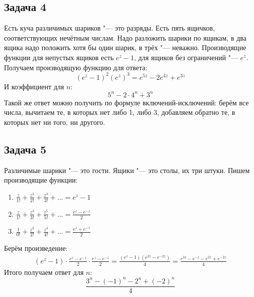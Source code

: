\subsection{Задача 4}
	Есть куча различимых шариков "--- это разряды.
	Есть пять ящичков, соответствующих нечётным числам.
	Надо разложить шарики по ящикам, в два ящика надо положить хотя бы один шарик, в трёх "--- неважно.
	Производящие функции для непустых ящиков есть $e^z-1$,
	для ящиков без ограничений "--- $e^z$.
	Получаем производящую функцию для ответа:
	\[ (e^z-1)^2(e^z)^3 = e^{5z}-2e^{4z}+e^{3z} \]
	И коэффициент для $n$:
	\[ 5^n - 2\cdot4^n + 3^n \]
	Такой же ответ можно получить по формуле включений-исключений: берём все числа, вычитаем те,
	в которых нет либо 1, либо 3, добавляем обратно те, в которых нет ни того, ни другого.

\subsection{Задача 5}
	Различимые шарики "--- это гости.
	Ящики "--- это столы, их три штуки.
	Пишем производящие функции:
	\begin{enumerate}
		\item $\frac{z}{1!} + \frac{z^2}{2!} + \frac{z^3}{3!} + \dots = e^z - 1$
		\item $\frac{z}{1!} + \frac{z^3}{3!} + \frac{z^5}{5!} + \dots = \frac{e^z - e^{-z}}{2}$
		\item $\frac{1}{0!} + \frac{z^2}{2!} + \frac{z^4}{4!} + \dots = \frac{e^z + e^{-z}}{2}$
	\end{enumerate}
	Берём произведение:
	\begin{gather*}
		(e^z-1)\cdot\frac{e^z-e^{-z}}{2}\cdot\frac{e^z-e^{-z}}{2} =
		\frac{(e^z-1)(e^{2z}-e^{-2z})}{4} =
		\frac{e^{3z}-e^{-z}-e^{2z}+e^{-2z}}{4}
	\end{gather*}
	Итого получаем ответ для $n$:
	\[ \frac{3^n-(-1)^n-2^n+(-2)^n}{4} \]

